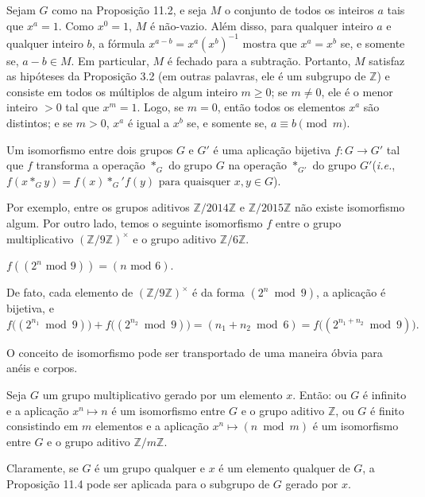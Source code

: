 Sejam $G$ como na Proposição 11.2, e seja $M$ o conjunto de todos os inteiros $a$ tais que $x^a = 1$. Como 
$x^0 = 1$, $M$ é não-vazio. Além disso, para qualquer inteiro $a$ e qualquer inteiro $b$, a fórmula
$x^{a-b} = x^a (x^b)^{-1}$ mostra que $x^a = x^b$ se, e somente se, $a - b \in M$. Em particular, $M$ é 
fechado para a subtração. Portanto, $M$ satisfaz as hipóteses da Proposição 3.2 (em outras palavras, ele 
é um subgrupo de $\mathbb{Z}$) e consiste em todos os múltiplos de algum inteiro $m \ge 0$; se $m \ne 0$, 
ele é o menor inteiro $> 0$ tal que $x^m = 1$. Logo, se $m = 0$, então todos os elementos $x^a$ são distintos; 
e se $m > 0$, $x^a$ é igual a $x^b$ se, e somente se, $a \equiv b \pmod{m}$.

\begin{definicao}
Um isomorfismo entre dois grupos $G$ e $G'$ é uma aplicação bijetiva
$f : G \to G'$
tal que $f$ transforma a operação $\ast_G$ do grupo $G$ na operação $\ast_{G'}$ do grupo $G'$(\emph{i.e.},
$f(x \ast_G y) = f(x) \ast_G' f(y) \text{ para quaisquer } x, y \in G$). 
\end{definicao}

Por exemplo, entre os grupos aditivos $\mathbb{Z}/2014\mathbb{Z}$ e $\mathbb{Z}/2015\mathbb{Z}$ não existe 
isomorfismo algum. Por outro lado, temos o seguinte isomorfismo $f$ entre o grupo multiplicativo 
$(\mathbb{Z}/9\mathbb{Z})^\times$ e o grupo aditivo $\mathbb{Z}/6\mathbb{Z}$.

\begin{center}
$f((2^n \text{ mod } 9)) = (n \text{ mod } 6)$.    
\end{center}

De fato, cada elemento de $(\mathbb{Z}/9\mathbb{Z})^\times$ é da forma $(2^n \bmod 9)$, a aplicação é bijetiva, e
$f\big((2^{n_1} \bmod 9)\big) + f\big((2^{n_2} \bmod 9)\big)
= (n_1 + n_2 \bmod 6) = f\big((2^{n_1+n_2} \bmod 9)\big).$

O conceito de isomorfismo pode ser transportado de uma maneira óbvia para anéis e corpos.

\begin{proposicao}
Seja $G$ um grupo multiplicativo gerado por um elemento $x$. Então: ou $G$ é infinito e a aplicação
$x^n \mapsto n$ é um isomorfismo entre $G$ e o grupo aditivo $\mathbb{Z}$, ou $G$ é finito consistindo 
em $m$ elementos e a aplicação $x^n \mapsto (n \bmod m)$ é um isomorfismo entre $G$ e o grupo aditivo 
$\mathbb{Z}/m\mathbb{Z}$.
\end{proposicao}

Claramente, se $G$ é um grupo qualquer e $x$ é um elemento qualquer de $G$, a Proposição 11.4 pode ser aplicada 
para o subgrupo de $G$ gerado por $x$.

